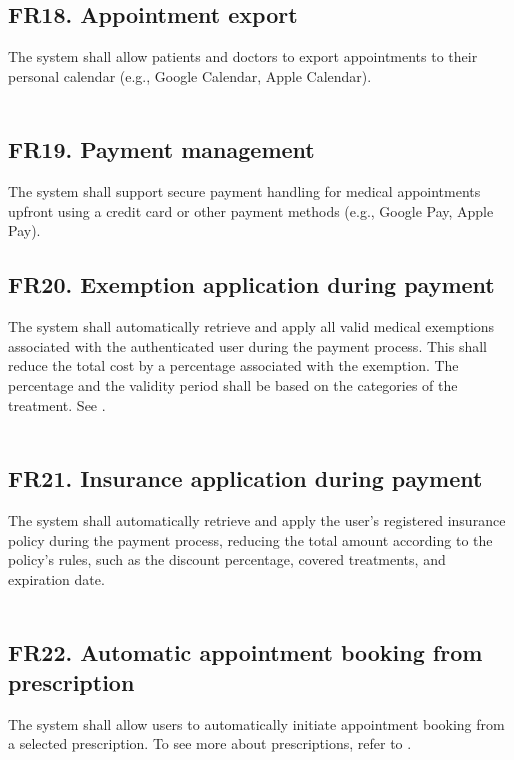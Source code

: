 \documentclass[12pt, a4paper]{article}
\begin{document}
\subsection{FR18. Appointment export} \label{FR18}
The system shall allow patients and doctors to export appointments to their personal calendar (e.g., Google Calendar, Apple Calendar).
\\ 
\\ 

\subsection{FR19. Payment management} \label{FR19}
The system shall support secure payment handling for medical appointments upfront using a credit card or other payment methods (e.g., Google Pay, Apple Pay).
\\ 

\subsection{FR20. Exemption application during payment} \label{FR20}
The system shall automatically retrieve and apply all valid medical exemptions associated with the authenticated user during the payment process. This shall reduce the total cost by a percentage associated with the exemption. The percentage and the validity period shall be based on the categories of the treatment. See .
\\ 
\\ 

\subsection{FR21. Insurance application during payment} \label{FR21}
The system shall automatically retrieve and apply the user's registered insurance policy during the payment process, reducing the total amount according to the policy's rules, such as the discount percentage, covered treatments, and expiration date.
\\ 
\\ 

\subsection{FR22. Automatic appointment booking from prescription} \label{FR22}
The system shall allow users to automatically initiate appointment booking from a selected prescription. To see more about prescriptions, refer to .
\\ 
\\ 
\\ 
\end{document}
